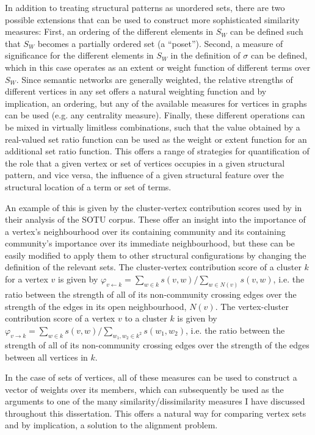 In addition to treating structural patterns as unordered sets, there are two possible extensions that can be used to construct more sophisticated similarity measures:
First, an ordering of the different elements in $S_{W}$ can be defined such that $S_{W}$ becomes a partially ordered set (a ``poset'').
Second, a measure of significance for the different elements in $S_{W}$ in the definition of $\sigma$ can be defined, which in this case operates as an extent or weight function of different terms over $S_{W}$.
Since semantic networks are generally weighted, the relative strengths of different vertices in any set offers a natural weighting function and by implication, an ordering, but any of the available measures for vertices in graphs can be used (e.g. any centrality measure).
Finally, these different operations can be mixed in virtually limitless combinations, such that the value obtained by a real-valued set ratio function can be used as the weight or extent function for an additional set ratio function.
This offers a range of strategies for quantification of the role that a given vertex or set of vertices occupies in a given structural pattern, and vice versa, the influence of a given structural feature over the structural location of a term or set of terms.

An example of this is given by the cluster-vertex contribution scores used by \citeauthor{rule2015} in their analysis of the SOTU corpus.
These offer an insight into the importance of a vertex's neighbourhood over its containing community and its containing community's importance over its immediate neighbourhood, but these can be easily modified to apply them to other structural configurations by changing the definition of the relevant sets.
The cluster-vertex contribution score of a cluster $k$ for a vertex $v$ is given by
$\varphi_{v \leftarrow k} = \sum_{w \in k} s(v,w) / \sum_{w \in N(v)} s(v,w)$, i.e. the ratio between the strength of all of its non-community crossing edges over the strength of the edges in its open neighbourhood, $N(v)$.
The vertex-cluster contribution score of a vertex $v$ to a cluster $k$ is given by
$\varphi_{v \rightarrow k} = \sum_{w \in k} s(v,w) / \sum_{w_1,w_2 \in k^2} s(w_1,w_2)$, i.e. the ratio between the strength of all of its non-community crossing edges over the strength of the edges between all vertices in $k$.

In the case of sets of vertices, all of these measures can be used to construct a vector of weights over its members, which can subsequently be used as the arguments to one of the many similarity/dissimilarity measures I have discussed throughout this dissertation.
This offers a natural way for comparing vertex sets and by implication, a solution to the alignment problem.


